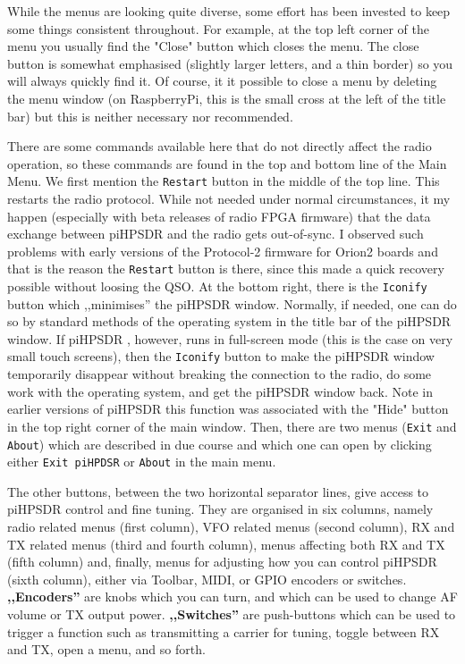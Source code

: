 \documentclass[12pt]{book}
\def\rett#1{\texttt{\color{red}#1}}
\def\bltt#1{\texttt{\color{blue}#1}}
\def\pH{pi\-HPSDR }
\begin{document}
While the menus are looking quite diverse, some effort has been invested to keep
some things consistent throughout. For example, at the top left corner of the menu
you usually find the "Close" button which closes the menu. The close button is somewhat
emphasised (slightly larger letters, and a thin border) so you will always quickly find it.
Of course, it it possible to close a menu by deleting the menu window (on RaspberryPi,
this is the small cross at the left of the title bar) but this is neither necessary nor
recommended.

There are some commands available here that do not directly affect the radio operation,
so these commands are found in the top and bottom line of the Main Menu. We first
mention the \rett{Restart} button in the middle of the top line. This restarts the
radio protocol. While not needed under normal circumstances, it my happen (especially
with beta releases of radio FPGA firmware) that the data exchange between \pH and
the radio gets out-of-sync. I observed such problems with early versions of the Protocol-2
firmware for Orion2 boards and that is the reason the \rett{Restart} button is
there, since this made a quick recovery possible without loosing the QSO.
At the bottom right, there is the \rett{Iconify} button which ,,minimises'' the
\pH window. Normally, if needed, one can do so by standard methods of the
operating system in the title bar of the \pH window. If \pH, however,
runs in full-screen mode (this is the case on very small touch screens), then the
\rett{Iconify} button to make the \pH window temporarily disappear without
breaking the connection to the radio, do some work with the operating system, and
get the \pH window back. Note in earlier versions of \pH this function was
associated with the "Hide" button in the top right corner of the main window.
Then, there are two menus (\bltt{Exit} and \bltt{About}) which are described in due course and which
one can open by clicking either \rett{Exit piHPDSR} or \rett{About} in the main menu.

The other buttons, between the two horizontal separator lines, give access to \pH
control and fine tuning. They are organised in six columns, namely radio related
menus (first column), VFO related menus (second column), RX and TX related menus (third
and fourth column), menus affecting both RX and TX (fifth column) and, finally,
menus for adjusting how you can control \pH (sixth column), either via Toolbar,
MIDI, or GPIO encoders or switches. \textbf{,,Encoders''} are knobs which you can turn, and which
can be used to change AF volume or TX output power. \textbf{,,Switches''} are push-buttons which
can be used to trigger a function such as transmitting a carrier for tuning, toggle
between RX and TX, open a menu, and so forth.
\end{document}
